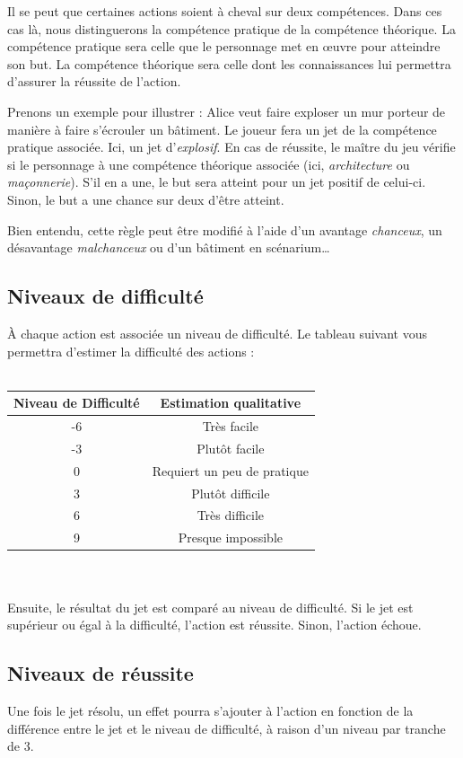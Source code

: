 \documentclass[oneside,12pt]{article}
\begin{document}
Il se peut que certaines actions soient \`a cheval sur deux comp\'etences.
Dans ces cas l\`a, nous distinguerons la comp\'etence pratique de la comp\'etence th\'eorique.
La comp\'etence pratique sera celle que le personnage met en \oe uvre pour atteindre son but.
La comp\'etence th\'eorique sera celle dont les connaissances lui permettra d'assurer la r\'eussite de l'action.

Prenons un exemple pour illustrer :
Alice veut faire exploser un mur porteur de mani\`ere \`a faire s'\'ecrouler un b\^atiment.
Le joueur fera un jet de la comp\'etence pratique associ\'ee.
Ici, un jet d'\textit{explosif}.
En cas de r\'eussite, le ma\^itre du jeu v\'erifie si le personnage \`a une comp\'etence th\'eorique associ\'ee (ici, \textit{architecture} ou \textit{ma\c connerie}).
S'il en a une, le but sera atteint pour un jet positif de celui-ci.
Sinon, le but a une chance sur deux d'\^etre atteint.

Bien entendu, cette r\`egle peut \^etre modifi\'e \`a l'aide d'un avantage \textit{chanceux}, un d\'esavantage \textit{malchanceux} ou d'un b\^atiment en sc\'enarium\ldots
\subsection{Niveaux de difficult\'e}
\label{gerer difficulte}
\`A chaque action est associ\'ee un niveau de difficult\'e.
Le tableau suivant vous permettra d'estimer la difficult\'e des actions :
\\ \\
\begin{tabular}{| c | c |}
  \hline
  Niveau de Difficult\'e & Estimation qualitative \\
  \hline
  -6 & Tr\`es facile \\
  \hline
  -3 & Plut\^ot facile \\
  \hline
  0 & Requiert un peu de pratique \\
  \hline
  3 & Plutôt difficile \\
  \hline
  6 & Tr\`es difficile \\
  \hline
  9 & Presque impossible \\
  \hline
\end{tabular}
\\ \\

Ensuite, le r\'esultat du jet est compar\'e au niveau de difficult\'e.
Si le jet est sup\'erieur ou \'egal à la difficult\'e, l'action est r\'eussite.
Sinon, l'action \'echoue.
\subsection{Niveaux de r\'eussite}
Une fois le jet r\'esolu, un effet pourra s'ajouter \`a l'action en fonction de la diff\'erence entre le jet et le niveau de difficult\'e, \`a raison d'un niveau par tranche de 3.
\end{document}
